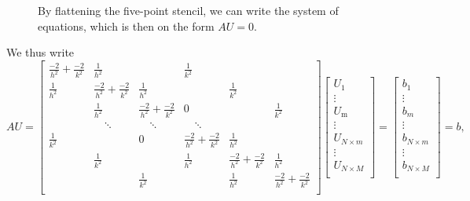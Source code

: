 \begin{figure}[htb]
    \centering
    
    \caption{By flattening the five-point stencil, we can write the system of equations, which is then on the form $AU = 0$.}
    \label{ex3:fig:flat_stencil}
\end{figure}

We thus write
\begin{equation*}
    \renewcommand{\arraystretch}{2.5} %
    AU = 
    \begin{bmatrix}
        \frac{-2}{h^2} + \frac{-2}{k^2} & \frac{1}{h^2} &&\frac{1}{k^2}\\
        \frac{1}{h^2} & \frac{-2}{h^2} + \frac{-2}{k^2}   & \frac{1}{h^2} &&\frac{1}{k^2}\\
        & \frac{1}{h^2} & \frac{-2}{h^2} + \frac{-2}{k^2}   & 0 &&\frac{1}{k^2}\\
        &  \quad \ddots & \quad \ddots  & \quad \ddots \\
        \frac{1}{k^2} && 0 & \frac{-2}{h^2} + \frac{-2}{k^2} & \frac{1}{h^2} \\
        & \frac{1}{k^2} && \frac{1}{h^2} & \frac{-2}{h^2} + \frac{-2}{k^2}   & \frac{1}{h^2} \\
        && \frac{1}{k^2} && \frac{1}{h^2} & \frac{-2}{h^2} + \frac{-2}{k^2} \\
    \end{bmatrix}
    \begin{bmatrix}
    U_\text{1} \\ \vdots \\ U_\text{m} \\ \vdots \\ U_{N \times m} \\ \vdots \\ U_{N \times M} \\
    \end{bmatrix}
    =
    \begin{bmatrix}
    b_1 \\ \vdots \\ b_m \\ \vdots \\ b_{N \times m} \\ \vdots \\ b_{N \times M}\\
    \end{bmatrix}
    = b,
    \label{ex3:eq:solution_equation}
\end{equation*}
